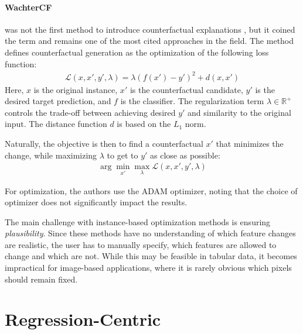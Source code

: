\begin{methodparagraph}
    \paragraph{WachterCF} \cite{wachter2017counterfactual} was not the first method to introduce counterfactual explanations \cite{cui2015optimal},
    but it coined the term and remains one of the most cited approaches in the field.
    The method defines counterfactual generation as the optimization of the following loss function:
    \begin{align*}
        \mathcal{L}(x, x', y', \lambda) = \lambda (f(x') - y')^2 + d(x, x')
    \end{align*}
    Here, $x$ is the original instance,
    $x'$ is the counterfactual candidate,
    $y'$ is the desired target prediction,
    and $f$ is the classifier.
    The regularization term $\lambda \in \mathbb{R}^+$ controls the trade-off between
    achieving desired $y'$ and similarity to the original input.
    The distance function $d$ is based on the $L_1$ norm.

    Naturally, the objective is then to find a counterfactual $x'$ that minimizes the change,
    while maximizing $\lambda$ to get to $y'$ as close as possible:
    \begin{align*}
        \arg \min_{x'} \max_{\lambda} \mathcal{L}(x, x', y', \lambda)
    \end{align*}

    For optimization, the authors use the ADAM optimizer,
    noting that the choice of optimizer does not significantly impact the results.
\end{methodparagraph}

The main challenge with instance-based optimization methods is ensuring \emph{plausibility}.
Since these methods have no understanding of which feature changes are realistic,
the user has to manually specify, which features are allowed to change and which are not.
While this may be feasible in tabular data, it becomes impractical for image-based applications,
where it is rarely obvious which pixels should remain fixed.


\section{Regression-Centric}



